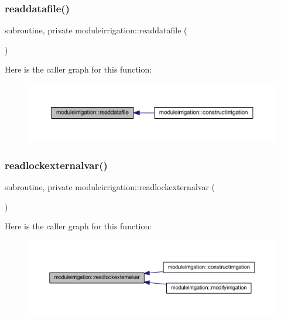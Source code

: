 \subsubsection{\texorpdfstring{readdatafile()}{readdatafile()}}
{\footnotesize\ttfamily subroutine, private moduleirrigation\+::readdatafile (\begin{DoxyParamCaption}{ }\end{DoxyParamCaption})\hspace{0.3cm}{\ttfamily [private]}}

Here is the caller graph for this function\+:\nopagebreak
\begin{figure}[H]
\begin{center}
\leavevmode
\includegraphics[width=350pt]{namespacemoduleirrigation_ae53033583e6896d868b4b65aa406c69f_icgraph}
\end{center}
\end{figure}
\mbox{\label{namespacemoduleirrigation_a70eefa9249ea662d2b9debe983aee68e}} 
\subsubsection{\texorpdfstring{readlockexternalvar()}{readlockexternalvar()}}
{\footnotesize\ttfamily subroutine, private moduleirrigation\+::readlockexternalvar (\begin{DoxyParamCaption}{ }\end{DoxyParamCaption})\hspace{0.3cm}{\ttfamily [private]}}

Here is the caller graph for this function\+:\nopagebreak
\begin{figure}[H]
\begin{center}
\leavevmode
\includegraphics[width=350pt]{namespacemoduleirrigation_a70eefa9249ea662d2b9debe983aee68e_icgraph}
\end{center}
\end{figure}
\mbox{\label{namespacemoduleirrigation_a27adbd031b4482b018dcd962be92a681}} 
